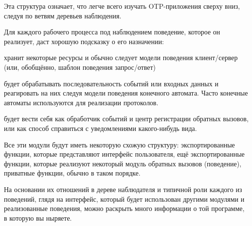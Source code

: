 \documentclass[11pt, oneside]{book}   	%
\begin{document}
Эта структура означает, что легче всего изучать OTP-приложения сверху вниз, следуя по ветвям деревьев наблюдения.

Для каждого рабочего процесса под наблюдением поведение, которое он реализует, даст хорошую подсказку о его назначении:

\begin{itemize*}
	\item {} хранит некоторые ресурсы и обычно следует модели поведения клиент/сервер (или, обобщённо, шаблон поведения запрос/ответ)
	\item {} будет обрабатывать последовательность событий или входных данных и реагировать на них следуя модели поведения конечного автомата. Часто конечные автоматы используются для реализации протоколов.
	\item {} будет вести себя как обработчик событий и центр регистрации обратных вызовов, или как способ справиться с уведомлениями какого-нибудь вида.
\end{itemize*}

Все эти модули будут иметь некоторую схожую структуру: экспортированные функции, которые представляют интерфейс пользователя, ещё экспортированные функции, которые реализуют некоторый модуль обратных вызовов (поведение), приватные функции, обычно в таком порядке.

На основании их отношений в дереве наблюдателя и типичной роли каждого из поведений, глядя на интерфейс, который будет использован другими модулями и реализованные поведения, можно раскрыть много информации о той программе, в которую вы ныряете.
\end{document}
